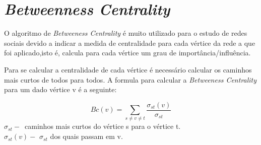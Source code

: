 \section{\textit{Betweenness Centrality}}

O algoritmo de \textit{Betweeness Centrality} é muito utilizado para o estudo 
de 
redes sociais devido a indicar a medida de centralidade para cada vértice da 
rede a que foi aplicado,isto é, calcula para cada vértice um grau de 
importância/influência. 

Para se calcular a centralidade de cada vértice é necessário calcular os 
caminhos mais curtos de todos para todos. A formula para calcular a 
\textit{Betweeness Centrality} para um dado vértice v é a seguinte:
\begin{center}
	\begin{equation}
		Bc(v) = \sum\limits_{s \neq v \neq t} 
\frac{\sigma_{st}(v)}{\sigma_{st}}
		\label{eq:bc}
	\end{equation}
	$\sigma_{st}-$~caminhos mais curtos do vértice s para o vértice t.\\
	$\sigma_{st}(v)-$ $\sigma_{st}$ dos quais passam em v.\\
\end{center}
